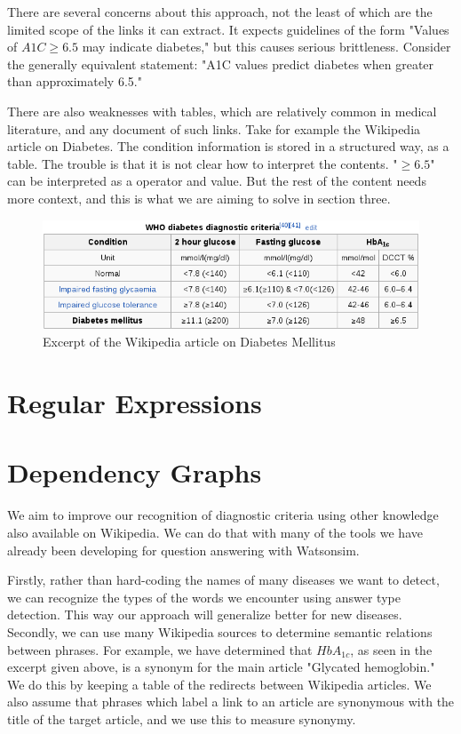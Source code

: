 \documentclass[12pt,letterpaper]{article}
\begin{document}
There are several concerns about this approach, not the least of which are the limited scope of the links it can extract. It expects guidelines of the form
"Values of $A1C \geq 6.5$ may indicate diabetes," but this causes serious brittleness. Consider the generally equivalent statement: "A1C values predict diabetes when greater than approximately 6.5."

There are also weaknesses with tables, which are relatively common in medical literature, and any document of such links. Take for example the Wikipedia article on Diabetes. The condition information is stored in a structured way, as a table. The trouble is that it is not clear how to interpret the contents. "$\geq 6.5$" can be interpreted as a operator and value. But the rest of the content needs more context, and this is what we are aiming to solve in section three.
\begin{figure}
\includegraphics[width=\textwidth]{WikipediaA1CTable}
\caption{Excerpt of the Wikipedia article on Diabetes Mellitus}
\end{figure}
\section{Regular Expressions}
\section{Dependency Graphs}
We aim to improve our recognition of diagnostic criteria using other knowledge also available on Wikipedia. We can do that with many of the tools we have already been developing for question answering with Watsonsim.

Firstly, rather than hard-coding the names of many diseases we want to detect, we can recognize the types of the words we encounter using answer type detection. This way our approach will generalize better for new diseases.
Secondly, we can use many Wikipedia sources to determine semantic relations between phrases. For example, we have determined that $HbA_{1c}$, as seen in the excerpt given above, is a synonym for the main article "Glycated hemoglobin." We do this by keeping a table of the redirects between Wikipedia articles. We also assume that phrases which label a link to an article are synonymous with the title of the target article, and we use this to measure synonymy.
\end{document}
